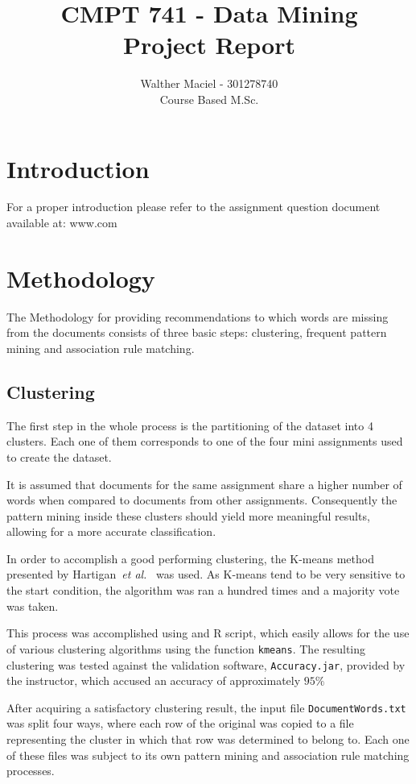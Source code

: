 \documentclass[11pt]{article}
\title{CMPT 741 - Data Mining\\ Project Report}
\author{Walther Maciel - 301278740\\ Course Based M.Sc.}
\begin{document}
\maketitle


\section{Introduction}
For a proper introduction please refer to the assignment question document available at: www.com

\section{Methodology}
The Methodology for providing recommendations to which words are missing from the documents consists of three basic steps: clustering, frequent pattern mining and association rule matching.


\subsection{Clustering}
The first step in the whole process is the partitioning of the dataset into 4 clusters. Each one of them corresponds to one of the four mini assignments used to create the dataset.

It is assumed that documents for the same assignment share a higher number of words when compared to documents from other assignments. Consequently the pattern mining inside these clusters should yield more meaningful results, allowing for a more accurate classification.

In order to accomplish a good performing clustering, the K-means  method presented by Hartigan~\emph{et al.}~\cite{hartigan79} was used. As K-means tend to be very sensitive to the start condition, the algorithm was ran a hundred times and a majority vote was taken.

This process was accomplished using and R script, which easily allows for the use of various clustering algorithms using the function \texttt{kmeans}. The resulting clustering was tested against the validation software, \texttt{Accuracy.jar}, provided by the instructor, which accused an accuracy of approximately $95\%$

After acquiring a satisfactory clustering result, the input file \texttt{DocumentWords.txt} was split four ways, where each row of the original was copied to a file representing the cluster in which that row was determined to belong to. Each one of these files was subject to its own pattern mining and association rule matching processes.
\end{document}
